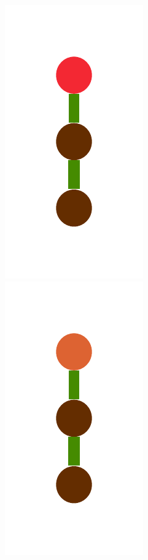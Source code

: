 \documentclass[a4paper,10pt]{article}
\begin{document}
\begin{figure}[t]
\includegraphics[scale=.26]{../figures/vector/4-2-4-constructor-induction-pre-2.pdf}
\includegraphics[scale=.26]{../figures/vector/4-2-4-constructor-induction-pre-3.pdf}

\end{figure}
\end{document}
